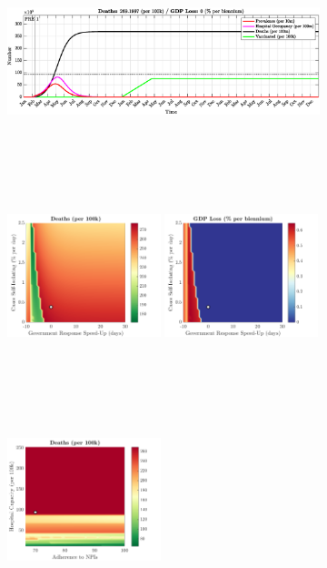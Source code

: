 \documentclass[paper=a4, fontsize=11pt]{scrartcl}
\numberwithin{figure}{section}
\numberwithin{table}{section}
\begin{document}
\begin{figure}[H]
\centering
    \begin{subfigure}[b]{\textwidth}
     	\includegraphics[width=\textwidth,height=5.5cm]{Counterfactuals/US_spfl}
    \end{subfigure}
    \begin{subfigure}[b]{\textwidth}
      	\includegraphics[width=0.49\textwidth,height=6cm]{US/SPANISH/ero_d}
	\hspace{0.05cm}
    	\includegraphics[width=0.49\textwidth,height=6cm]{US/SPANISH/ero_g}
    \end{subfigure}
    \begin{subfigure}[b]{\textwidth}
      	\includegraphics[width=0.49\textwidth,height=6cm]{US/SPANISH/npl_d}

\end{subfigure}
\end{figure}
\end{document}
